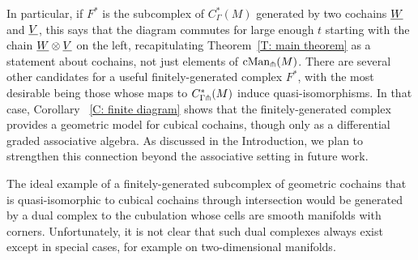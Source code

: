 In particular, if $F^*$ is the subcomplex of $C^*_\Gamma(M)$ generated by two cochains $\underline{W}$ and $\underline{V}$, this says that the diagram 
commutes for large enough $t$ starting with the chain $\underline{W}\otimes\underline{V}$ on the left, recapitulating Theorem~\ref{T: main theorem} as a statement about cochains, not just elements of $\mathrm{cMan}_\pitchfork(M)$.
There are several other candidates for a useful finitely-generated complex $F^*$, 
with the most desirable being those whose maps to $C^*_{\Gamma \pitchfork}(M)$ induce quasi-isomorphisms.  In that case, Corollary ~\ref{C: finite diagram}
shows that the finitely-generated complex provides a geometric model for cubical cochains, though only as a differential graded associative algebra.
As discussed in the Introduction, we plan to strengthen this connection beyond the associative setting in future work.

The ideal  example of a finitely-generated subcomplex of geometric cochains that is quasi-isomorphic to cubical cochains through intersection
would be generated by a dual complex to the cubulation whose cells are smooth manifolds with corners.
Unfortunately, it is not clear that such dual complexes always exist except in special cases, for example on two-dimensional manifolds.

